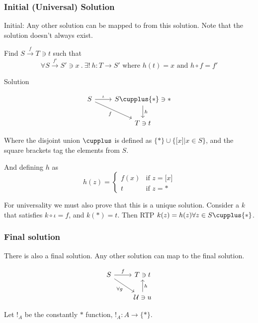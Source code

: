 \documentclass[a4paper, 12pt]{article}
\theoremstyle{definition}
\begin{document}
\subsubsection*{Initial (Universal) Solution}
Initial: Any other solution can be mapped to from this solution. Note that the
solution doesn't always exist.

Find $S \overset{f}{\rightarrow} T \ni t$ such that
$$
\forall S \overset{f'}{\rightarrow} S' \ni x \ .\ 
\exists!\ h : T \rightarrow S' \text{ where }
h(t) = x \text{ and }
h \circ f = f'
$$

Solution

$$
    \begin{tikzcd}
        S \arrow[r, "\iota"]
          \arrow[dr, swap, "f"]
          & 
        S \cupplus \{\ast\} \ni \ast
          \arrow[d, "h"]
          \\
        {}
          &
        T \ni t
    \end{tikzcd}
$$

Where the disjoint union $\cupplus$ is defined as $\{\ast\} \cup \{ \lbrack
x\rbrack | x \in S \}$, and the square brackets tag the elements from $S$.

And defining $h$ as
\begin{equation*}
    h(z) = \begin{cases}
        f(x) & \text{if } z = \lbrack x \rbrack \\
        t & \text{if } z = \ast
    \end{cases}
\end{equation*}

For universality we must also prove that this is a unique solution.
Consider a $k$ that satisfies $k \circ \iota = f$, and $k(\ast) = t$. Then RTP
$k(z) = h(z) \forall z \in S \cupplus \{ \ast \}$.

\subsubsection*{Final solution}
There is also a final solution. Any other solution can map to the final
solution.

$$
    \begin{tikzcd}
        S \arrow[r, "f"]
          \arrow[dr, swap, "\forall g"]
          & 
        T \ni t
          \\
        {}
          &
        \mathcal{U} \ni u
          \arrow[u, swap, "h"]
    \end{tikzcd}
$$

Let $!_A$ be the constantly $\ast$ function, $!_A : A \rightarrow \{ \ast \}$.
\end{document}

